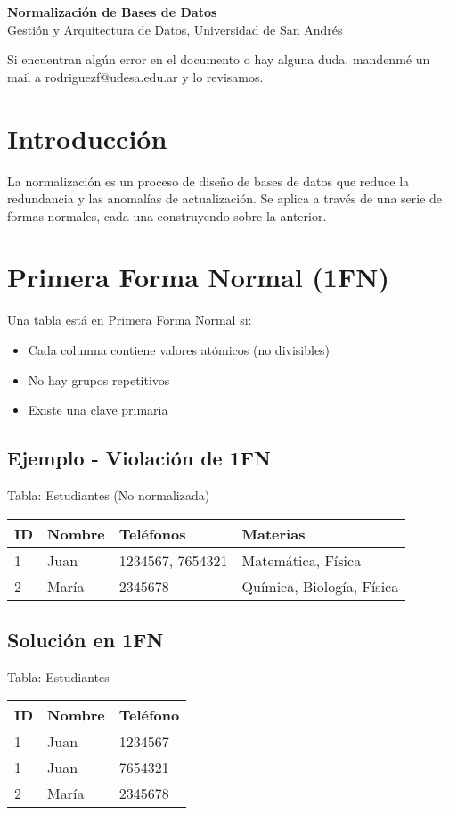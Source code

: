 \documentclass[12pt]{article}
\begin{document}
\begin{center}
  {\LARGE \textbf{Normalización de Bases de Datos}}\\[0.5em]
  {Gestión y Arquitectura de Datos, Universidad de San Andrés}
\end{center}

Si encuentran algún error en el documento o hay alguna duda, mandenmé un mail a rodriguezf@udesa.edu.ar y lo revisamos.

\section{Introducción}
La normalización es un proceso de diseño de bases de datos que reduce la redundancia y las anomalías de actualización. Se aplica a través de una serie de formas normales, cada una construyendo sobre la anterior.

\section{Primera Forma Normal (1FN)}
Una tabla está en Primera Forma Normal si:
\begin{itemize}
    \item Cada columna contiene valores atómicos (no divisibles)
    \item No hay grupos repetitivos
    \item Existe una clave primaria
\end{itemize}

\subsection{Ejemplo - Violación de 1FN}
Tabla: Estudiantes (No normalizada)
\begin{center}
\begin{tabular}{llll}
\toprule
ID & Nombre & Teléfonos & Materias \\
\midrule
1 & Juan & 1234567, 7654321 & Matemática, Física \\
2 & María & 2345678 & Química, Biología, Física \\
\bottomrule
\end{tabular}
\end{center}

\subsection{Solución en 1FN}

Tabla: Estudiantes
\begin{center}
\begin{tabular}{lll}
\toprule
ID & Nombre & Teléfono \\
\midrule
1 & Juan & 1234567 \\
1 & Juan & 7654321 \\
2 & María & 2345678 \\
\bottomrule
\end{tabular}
\end{center}
\end{document}
